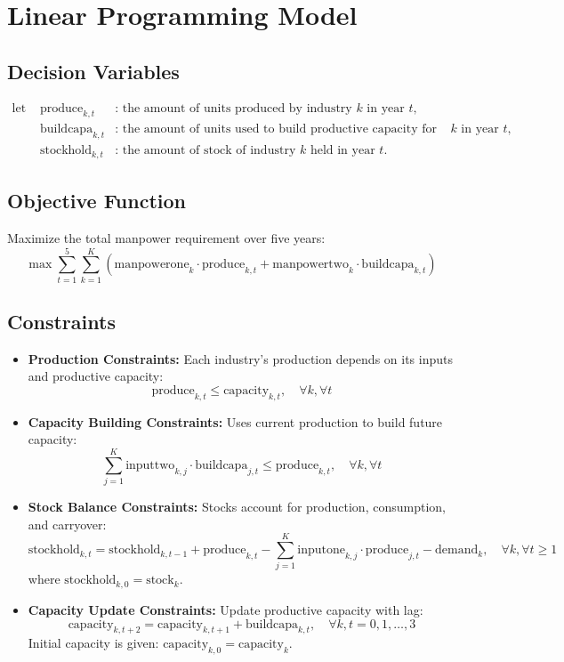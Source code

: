 \documentclass{article}
\begin{document}
\section*{Linear Programming Model}

\subsection*{Decision Variables}
\begin{align*}
\text{let } & \text{produce}_{k, t} & \text{: the amount of units produced by industry } k \text{ in year } t, \\
& \text{buildcapa}_{k, t} & \text{: the amount of units used to build productive capacity for industry } k \text{ in year } t, \\
& \text{stockhold}_{k, t} & \text{: the amount of stock of industry } k \text{ held in year } t.
\end{align*}

\subsection*{Objective Function}
Maximize the total manpower requirement over five years:
\[
\max \sum_{t=1}^{5} \sum_{k=1}^{K} \left( \text{manpowerone}_k \cdot \text{produce}_{k, t} + \text{manpowertwo}_k \cdot \text{buildcapa}_{k, t} \right)
\]

\subsection*{Constraints}
\begin{itemize}
    \item \textbf{Production Constraints:} Each industry's production depends on its inputs and productive capacity:
    \[
    \text{produce}_{k, t} \leq \text{capacity}_{k, t}, \quad \forall k, \forall t
    \]

    \item \textbf{Capacity Building Constraints:} Uses current production to build future capacity:
    \[
    \sum_{j=1}^{K} \text{inputtwo}_{k, j} \cdot \text{buildcapa}_{j, t} \leq \text{produce}_{k, t}, \quad \forall k, \forall t
    \]

    \item \textbf{Stock Balance Constraints:} Stocks account for production, consumption, and carryover:
    \[
    \text{stockhold}_{k, t} = \text{stockhold}_{k, t-1} + \text{produce}_{k, t} - \sum_{j=1}^{K} \text{inputone}_{k, j} \cdot \text{produce}_{j, t} - \text{demand}_{k}, \quad \forall k, \forall t \geq 1
    \]
    where \(\text{stockhold}_{k, 0} = \text{stock}_{k}\).

    \item \textbf{Capacity Update Constraints:} Update productive capacity with lag:
    \[
    \text{capacity}_{k, t+2} = \text{capacity}_{k, t+1} + \text{buildcapa}_{k, t}, \quad \forall k, t=0,1,\ldots,3
    \]
    Initial capacity is given: \(\text{capacity}_{k, 0} = \text{capacity}_{k}\).
\end{itemize}
\end{document}
